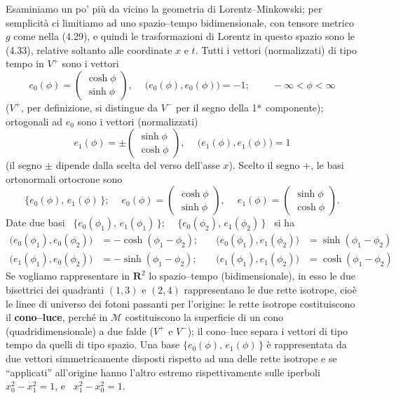 Esaminiamo un po' pi\`u da vicino la geometria di Lorentz--Minkowski; per
semplicit\`a ci limitiamo ad uno spazio--tempo bidimensionale, con tensore
metrico $g$ come nella (4.29), e quindi le trasformazioni di Lorentz in questo
spazio sono le (4.33), relative soltanto alle coordinate $x$ e $t$. Tutti i
vettori (normalizzati) di tipo tempo in $V^+$ sono i vettori
\begin{equation}
  e_0(\phi)=\begin{pmatrix}\cosh\phi\\\sinh\phi\end{pmatrix},
  \quad\ \big(e_0(\phi),e_0(\phi)\big)=-1;\qquad\ -\infty<\phi<\infty
  \tag{4.57}
\end{equation}
($V^+$, per definizione, si distingue da $V^-$ per il segno della 1$^{\rm a}$
componente); ortogonali ad $e_0$ sono i vettori (normalizzati)
\begin{equation}
  e_1(\phi)=\pm\begin{pmatrix}\sinh\phi\\\cosh\phi\end{pmatrix},
  \quad\ \big(e_1(\phi),e_1(\phi)\big)=1
  \tag{4.58}
\end{equation}
(il segno $\pm$ dipende dalla scelta del verso dell'asse $x$). Scelto il segno
$+$, le basi ortonormali ortocrone sono
\begin{equation}
  \{e_0(\phi),\,e_1(\phi)\,\};\quad\ e_0(\phi)=\begin{pmatrix}\cosh\phi\\
  \sinh\phi\end{pmatrix},\quad\ e_1(\phi)=\begin{pmatrix}\sinh\phi\\
  \cosh\phi\end{pmatrix}.
  \tag{4.59}
\end{equation}
Date due basi \ $\{e_0(\phi_1),\,e_1(\phi_1)\,\}$;
\ \ $\{e_0(\phi_2),\,e_1(\phi_2)\,\}$ \ si ha
\begin{equation}
  \begin{aligned}
    \big(e_0(\phi_1),e_0(\phi_2)\big)&=-\cosh(\phi_1-\phi_2);
    &\quad\big(e_0(\phi_1),e_1(\phi_2)\big)&=\sinh(\phi_1-\phi_2)\\
    \big(e_1(\phi_1),e_0(\phi_2)\big)&=-\sinh(\phi_1-\phi_2);
    &\quad\big(e_1(\phi_1),e_1(\phi_2)\big)&=\cosh(\phi_1-\phi_2)
  \end{aligned}
  \tag{4.60}
\end{equation}
Se vogliamo rappresentare in $\boldsymbol R^2$ lo spazio--tempo
(bidimensionale), in esso le due bisettrici dei quadranti $(1,3)$ e $(2,4)$
rappresentano le due rette isotrope, cio\`e le linee di universo dei fotoni
passanti per l'origine: le rette isotrope costituiscono il \textbf{cono--luce},
perch\'e in $\mathcal M$ costituiscono la superficie di un cono
(quadridimensionale) a due falde ($V^+$ e $V^-$); il cono--luce separa i vettori
di tipo tempo da quelli di tipo spazio. Una base $\{e_0(\phi),\,e_1(\phi)\,\}$
\`e rappresentata da due vettori simmetricamente disposti rispetto ad una delle
rette isotrope e se ``applicati'' all'origine hanno l'altro estremo
rispettivamente sulle iperboli \ $x_0^2-x_1^2=1$, e \ $x_1^2-x_0^2=1$.

